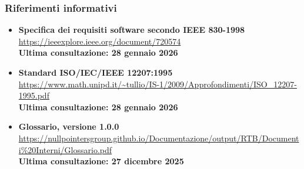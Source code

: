 	\subsubsection{Riferimenti informativi}
	\begin{itemize}[itemsep=5pt, parsep=5pt, label=$\scriptstyle\bullet$]

    \item \textbf{Specifica dei requisiti software secondo IEEE 830-1998}\\
     \url{https://ieeexplore.ieee.org/document/720574}\\[3pt]
    \textbf{Ultima consultazione: 28 gennaio 2026}

    \item \textbf{Standard ISO/IEC/IEEE 12207:1995}\\
     \url{https://www.math.unipd.it/~tullio/IS-1/2009/Approfondimenti/ISO_12207-1995.pdf}\\[3pt]
    \textbf{Ultima consultazione: 28 gennaio 2026}

	\item \textbf{Glossario, versione 1.0.0}\\
     \url{https://nullpointersgroup.github.io/Documentazione/output/RTB/Documenti%20Interni/Glossario.pdf}\\[3pt]
    \textbf{Ultima consultazione: 27 dicembre 2025}

	\end{itemize}